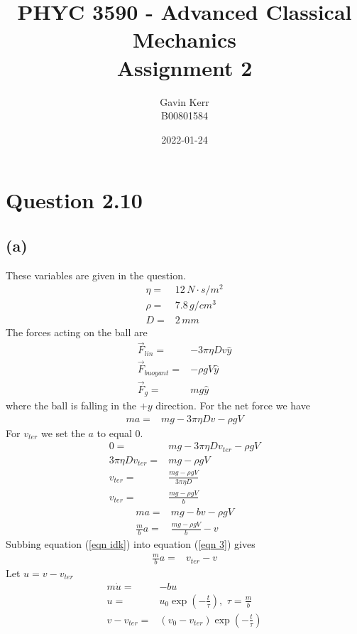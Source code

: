 \documentclass[12pt, a4paper]{article}
\title{PHYC 3590 - Advanced Classical Mechanics\\Assignment 2}
\author{Gavin Kerr\\B00801584}
\date{2022-01-24}
\begin{document}
\maketitle


\section*{Question 2.10}
\subsection*{(a)}
These variables are given in the question.
\begin{align*}
\eta =& 12 \, N\cdot s/m^2
\\
\rho =& 7.8 \, g/cm^3
\\
D =& 2 \, mm
\end{align*}
The forces acting on the ball are 
\begin{align*}
\vec{F}_{lin} =& - 3\pi \eta D v\hat{y}
\\
\vec{F}_{buoyant} =& -\rho g V \hat{y}
\\
\vec{F}_{g} =& mg\hat{y}
\end{align*}
where the ball is falling in the $+y$ direction. For the net force we have
\begin{align*}
ma =& mg - 3 \pi \eta D v - \rho g V   
\end{align*}
For $v_{ter}$ we set the $a$ to equal $0$.
\begin{align}
0 =& mg - 3 \pi \eta D v_{ter} - \rho g V  
\\
3 \pi \eta D v_{ter} =& mg - \rho gV 
\\
v_{ter} =& \frac{mg - \rho gV}{3 \pi \eta D}
\\
v_{ter} =& \frac{mg - \rho gV}{b} \label{eqn idk}
\end{align}
\begin{align}
ma =& mg - b v - \rho g V   
\\
\frac{m}{b}a =& \frac{mg - \rho gV}{b}   -  v \label{eqn 3}
\end{align}
Subbing equation (\ref{eqn idk}) into equation (\ref{eqn 3}) gives
\begin{align*}
\frac{m}{b}a =& v_{ter} -  v
\end{align*}
Let $u = v - v_{ter}$
\begin{align*}
m\dot{u} =& -bu
\\
u =& u_0 \exp \left( -\frac{t}{\tau} \right), \,\, \tau = \frac{m}{b}
\\
v - v_{ter} =& (v_0 - v_{ter})\exp \left( -\frac{t}{\tau} \right)
\end{align*}
\end{document}
